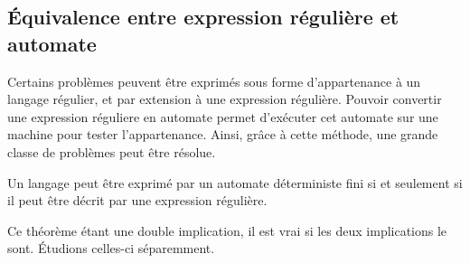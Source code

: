 


\subsection{Équivalence entre expression régulière et automate}\label{ss:e-a}

Certains problèmes peuvent être exprimés sous forme d'appartenance à un langage régulier, et par extension à une expression régulière.
Pouvoir convertir une expression réguliere en automate permet d'exécuter cet automate sur une machine pour tester l'appartenance. Ainsi, grâce à cette méthode, une grande classe de problèmes peut être résolue.


\begin{theorem}
	Un langage peut être exprimé par un automate déterministe fini si et seulement si il peut être décrit par une expression régulière.
\end{theorem}

Ce théorème étant une double implication, il est vrai si les deux implications le sont. Étudions celles-ci séparemment.


